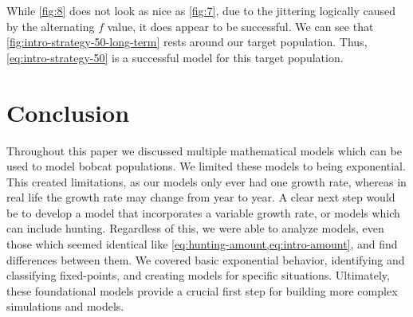 \documentclass{article}
\begin{document}
While \cref{fig:8} does not look as nice as \cref{fig:7}, due to the jittering logically caused by the alternating $f$ value, it does appear to be successful. We can see that \cref{fig:intro-strategy-50-long-term} rests around our target population. Thus, \cref{eq:intro-strategy-50} is a successful model for this target population.

\section{Conclusion}
Throughout this paper we discussed multiple mathematical models which can be used to model bobcat populations. We limited these models to being exponential. This created limitations, as our models only ever had one growth rate, whereas in real life the growth rate may change from year to year. A clear next step would be to develop a model that incorporates a variable growth rate, or models which can include hunting. Regardless of this, we were able to analyze models, even those which seemed identical like \cref{eq:hunting-amount,eq:intro-amount}, and find differences between them. We covered basic exponential behavior, identifying and classifying fixed-points, and creating models for specific situations. Ultimately, these foundational models provide a crucial first step for building more complex simulations and models.
\end{document}
